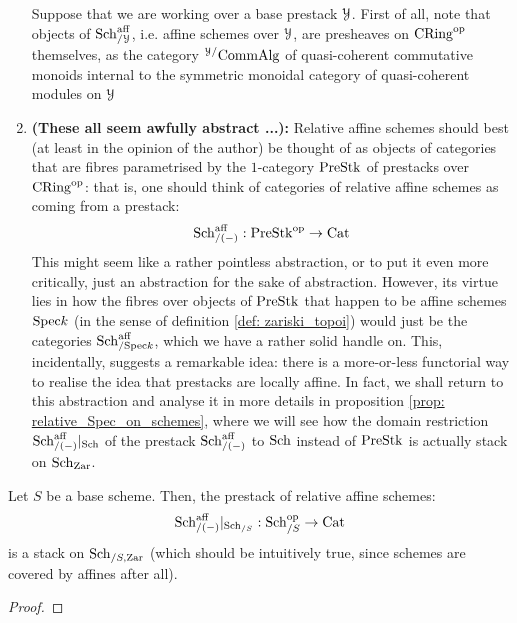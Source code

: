 \begin{remark}
\begin{enumerate}
                            Suppose that we are working over a base prestack $\mathcal{Y}$. First of all, note that objects of $\mathrm{Sch}^{\mathrm{aff}}_{/\mathcal{Y}}$, i.e. affine schemes over $\mathcal{Y}$, are presheaves on $\mathrm{CRing}^{\mathrm{op}}$ themselves, as the category ${}^{\mathcal{Y}/}\mathrm{Comm}\mathrm{Alg}$ of quasi-coherent commutative monoids internal to the symmetric monoidal category of quasi-coherent modules on $\mathcal{Y}$
                            \item \textbf{(These all seem awfully abstract ...):} Relative affine schemes should best (at least in the opinion of the author) be thought of as objects of categories that are fibres parametrised by the $1$-category $\mathrm{Pre}\mathrm{Stk}$ of prestacks over $\mathrm{CRing}^{\mathrm{op}}$: that is, one should think of categories of relative affine schemes as coming from a prestack:
                                $$\mathrm{Sch}^{\mathrm{aff}}_{/(-)}: \mathrm{Pre}\mathrm{Stk}^{\mathrm{op}} \to \mathrm{Cat}$$
                            This might seem like a rather pointless abstraction, or to put it even more critically, just an abstraction for the sake of abstraction. However, its virtue lies in how the fibres over objects of $\mathrm{Pre}\mathrm{Stk}$ that happen to be affine schemes $\mathrm{Spec} k$ (in the sense of definition \ref{def: zariski_topoi}) would just be the categories $\mathrm{Sch}^{\mathrm{aff}}_{/\mathrm{Spec} k}$, which we have a rather solid handle on. This, incidentally, suggests a remarkable idea: there is a more-or-less functorial way to realise the idea that prestacks are locally affine. In fact, we shall return to this abstraction and analyse it in more details in proposition \ref{prop: relative_Spec_on_schemes}, where we will see how the domain restriction $\mathrm{Sch}^{\mathrm{aff}}_{/(-)}|_{\mathrm{Sch}}$ of the prestack $\mathrm{Sch}^{\mathrm{aff}}_{/(-)}$ to $\mathrm{Sch}$ instead of $\mathrm{Pre}\mathrm{Stk}$ is actually stack on $\mathrm{Sch}_{\mathrm{Zar}}$.
                        \end{enumerate}
                    \end{remark}
                    
                    \begin{proposition} \label{prop: relative_Spec_on_schemes}
                        Let $S$ be a base scheme. Then, the prestack of relative affine schemes:
                            $$\mathrm{Sch}^{\mathrm{aff}}_{/(-)}|_{\mathrm{Sch}_{/S}}: \mathrm{Sch}_{/S}^{\mathrm{op}} \to \mathrm{Cat}$$
                        is a stack on $\mathrm{Sch}_{/S, \mathrm{Zar}}$ (which should be intuitively true, since schemes are covered by affines after all).
                    \end{proposition}
                        \begin{proof}
                            
                        \end{proof}
                
